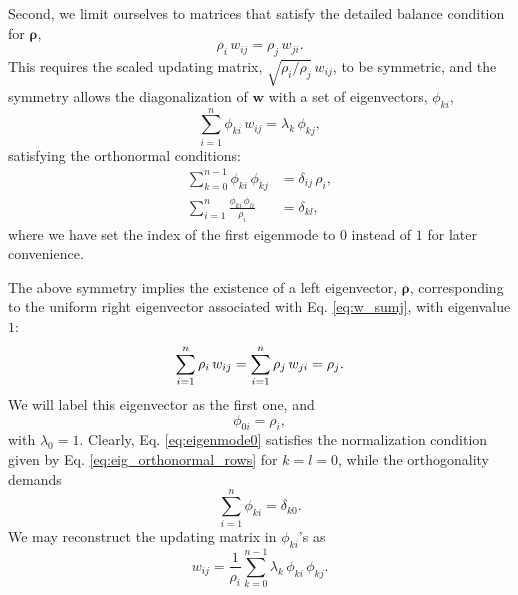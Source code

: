 \documentclass[reprint, superscriptaddress, floatfix]{revtex4-1}
\begin{document}
Second, we limit ourselves to matrices %
that satisfy
the detailed balance condition for $\pmb\rho$,
%
\begin{equation}
  \rho_i \, w_{ij} = \rho_j \, w_{ji}
  .
  \label{eq:w_detailedbalance}
\end{equation}
%
This requires the scaled updating matrix,
$\sqrt{ \rho_i/\rho_j } \, w_{ij}$,
to be symmetric,
and the symmetry allows the diagonalization
of $\mathbf w$ with a set of
eigenvectors, $\phi_{ki}$,
%
\begin{equation}
  \sum_{i = 1}^n \phi_{ki} \, w_{ij}
  =
  \lambda_k \, \phi_{kj}
  ,
\label{eq:eig_w}
\end{equation}
%
satisfying the orthonormal conditions\cite{vankampen}:
%
\begin{align}
  \sum_{k = 0}^{n - 1}
    \phi_{ki} \, \phi_{kj}
  &=
  \delta_{ij} \, \rho_i,
  \label{eq:eig_orthonormal_cols}
  \\
  \sum_{i = 1}^n
    \frac{ \phi_{ki} \, \phi_{li} }
         { \rho_i }
  &=
  \delta_{kl}
  ,
  \label{eq:eig_orthonormal_rows}
\end{align}
%
where we have set the index of the first eigenmode to $0$
instead of $1$ for later convenience.

The above symmetry implies the existence of
a left eigenvector, $\pmb \rho$,
corresponding to the uniform right eigenvector
associated with Eq. \eqref{eq:w_sumj},
with eigenvalue $1$:
%
\begin{equation}
  \sum_{i = 1}^n \rho_i \, w_{ij}
  =
  \sum_{i = 1}^n \rho_j \, w_{ji}
  =
  \rho_j
  .
  \notag
\end{equation}
%
We will label this eigenvector as the first one,
and
%
\begin{equation}
  \phi_{0i} = \rho_i,
\label{eq:eigenmode0}
\end{equation}
%
with $\lambda_0 = 1$.
%
Clearly, Eq. \eqref{eq:eigenmode0}
satisfies the normalization condition
given by Eq. \eqref{eq:eig_orthonormal_rows}
for $k = l = 0$,
while the orthogonality demands
%
\begin{equation}
  \sum_{ i = 1 }^n \phi_{ki}
  =
  \delta_{k0}
  .
\label{eq:ortho0}
\end{equation}
%
We may reconstruct the updating matrix in $\phi_{ki}$'s
as\cite{bussi2006}
%
\begin{equation}
  w_{ij}
  =
  \frac{1}{\rho_i} \sum_{k=0}^{n - 1}
  \lambda_k \, \phi_{ki} \, \phi_{kj}
  .
  \label{eq:w_from_phi}
\end{equation}
\end{document}
